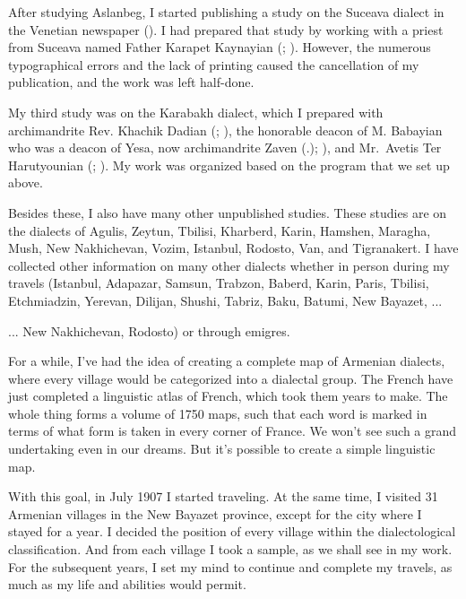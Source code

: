 After studying Aslanbeg, I started publishing a study on the Suceava dialect in the Venetian newspaper \citeauthor{Bazmaveb} (). I had prepared that study by working with a priest from Suceava named Father Karapet Kaynayian (; ). However, the numerous typographical errors and the lack of printing caused the cancellation of my publication, and the work was left half-done.

My third study was on the Karabakh dialect, which I prepared with archimandrite Rev. Khachik Dadian (; ), the honorable deacon of M. Babayian who was a deacon of Yesa, now archimandrite Zaven (.); ), and Mr.~Avetis Ter Harutyounian (; ). My work was organized based on the program that we set up above. 

Besides these, I also have many other unpublished studies. These studies are on the dialects of Agulis, Zeytun, Tbilisi, Kharberd, Karin, Hamshen, Maragha, Mush, New Nakhichevan, Vozim, Istanbul, Rodosto, Van, and Tigranakert. I have collected other information on many other dialects whether in person during my travels (Istanbul, Adapazar, Samsun, Trabzon, Baberd, Karin, Paris, Tbilisi, Etchmiadzin, Yerevan, Dilijan, Shushi, Tabriz, Baku, Batumi, New Bayazet, ... 


\begin{adjarianpage}\label{page:14}\end{adjarianpage}%

... New Nakhichevan, Rodosto) or through emigres. 

For a while, I've had the idea of creating a complete map of Armenian dialects, where every village would be categorized into a dialectal group. The French have just completed a linguistic atlas of French, which took them years to make. The whole thing forms a volume of 1750 maps, such that each word is marked in terms of what form is taken in every corner of France. We won't see such a grand undertaking even in our dreams. But it's possible to create a simple linguistic map.

With this goal, in July 1907 I started traveling. At the same time, I visited 31 Armenian villages in the New Bayazet province, except for the city where I stayed for a year. I decided the position of every village within the dialectological classification. And from each village I took a sample, as we shall see in my work. For the subsequent years, I set my mind to continue and complete my travels, as much as my life and abilities would permit. 

